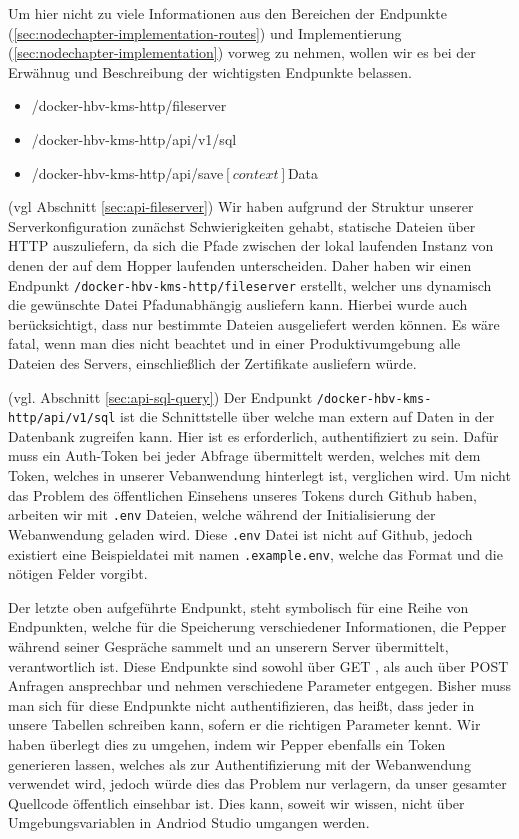 Um hier nicht zu viele Informationen aus den Bereichen der Endpunkte (\ref{sec:nodechapter-implementation-routes}) und Implementierung (\ref{sec:nodechapter-implementation}) vorweg zu nehmen, wollen wir es bei der Erwähnug und Beschreibung der wichtigsten Endpunkte belassen.

\begin{itemize}
    \item /docker-hbv-kms-http/fileserver
    \item /docker-hbv-kms-http/api/v1/sql
    \item /docker-hbv-kms-http/api/save$\left[context\right]$Data
\end{itemize}

(vgl Abschnitt \ref{sec:api-fileserver}) Wir haben aufgrund der Struktur unserer Serverkonfiguration zunächst Schwierigkeiten gehabt, statische Dateien über HTTP auszuliefern, da sich die Pfade zwischen der lokal laufenden Instanz von denen der auf dem Hopper laufenden unterscheiden. Daher haben wir einen Endpunkt \verb|/docker-hbv-kms-http/fileserver| erstellt, welcher uns dynamisch die gewünschte Datei Pfadunabhängig ausliefern kann. Hierbei wurde auch berücksichtigt, dass nur bestimmte Dateien ausgeliefert werden können. Es wäre fatal, wenn man dies nicht beachtet und in einer Produktivumgebung alle Dateien des Servers, einschließlich der Zertifikate ausliefern würde.

(vgl. Abschnitt \ref{sec:api-sql-query}) Der Endpunkt \verb|/docker-hbv-kms-http/api/v1/sql| ist die Schnittstelle über welche man extern auf Daten in der
Datenbank zugreifen kann. Hier ist es erforderlich, authentifiziert zu sein.
Dafür muss ein Auth-Token bei jeder Abfrage übermittelt werden, welches mit dem Token, welches in unserer Vebanwendung hinterlegt ist, verglichen wird. Um nicht das Problem des öffentlichen Einsehens unseres Tokens durch Github haben, arbeiten wir mit \verb|.env| Dateien, welche während der Initialisierung der Webanwendung geladen wird. Diese \verb|.env| Datei ist nicht auf Github, jedoch existiert eine Beispieldatei mit namen \verb|.example.env|, welche das Format und die
nötigen Felder vorgibt.

Der letzte oben aufgeführte Endpunkt, steht symbolisch für eine Reihe von Endpunkten, welche für die Speicherung verschiedener Informationen, die Pepper während seiner Gespräche sammelt und an unserern Server übermittelt, verantwortlich ist. Diese Endpunkte sind sowohl über GET , als auch über POST Anfragen ansprechbar und nehmen verschiedene Parameter entgegen. Bisher muss man sich für diese Endpunkte nicht authentifizieren, das heißt, dass jeder in unsere Tabellen schreiben kann, sofern er die richtigen Parameter kennt. Wir haben überlegt dies zu umgehen, indem wir Pepper ebenfalls ein Token generieren lassen, welches als zur Authentifizierung mit der Webanwendung verwendet wird, jedoch würde dies das Problem nur verlagern, da unser gesamter Quellcode öffentlich einsehbar ist. Dies kann, soweit wir wissen, nicht über Umgebungsvariablen in Andriod Studio umgangen werden.


